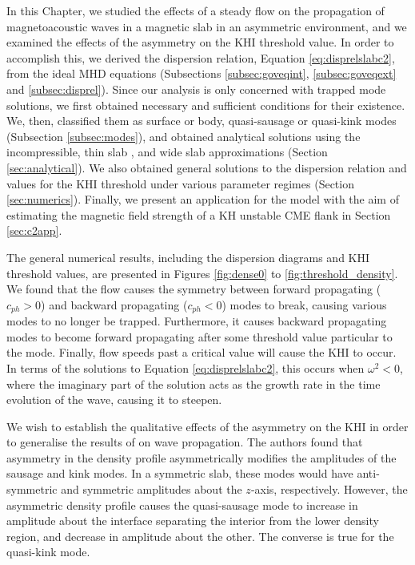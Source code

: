 In this Chapter, we studied the effects of a steady flow on the propagation of magnetoacoustic waves in a magnetic slab in an asymmetric environment, and we examined the effects of the asymmetry on the KHI threshold value.
In order to accomplish this, we derived the dispersion relation, Equation \eqref{eq:disprelslabc2}, from the ideal MHD equations (Subsections \ref{subsec:goveqint}, \ref{subsec:goveqext} and \ref{subsec:disprel}).
Since our analysis is only concerned with trapped mode solutions, we first obtained necessary and sufficient conditions for their existence.
We, then, classified them as surface or body, quasi-sausage or quasi-kink modes (Subsection \ref{subsec:modes}), and obtained analytical solutions using the incompressible, thin slab , and wide slab approximations (Section \ref{sec:analytical}).
We also obtained general solutions to the dispersion relation and values for the KHI threshold under various parameter regimes (Section \ref{sec:numerics}).
Finally, we present an application for the model with the aim of estimating the magnetic field strength of a KH unstable CME flank in Section \ref{sec:c2app}.

The general numerical results, including the dispersion diagrams and KHI threshold values, are presented in Figures \ref{fig:dense0} to \ref{fig:threshold_density}.
We found that the flow causes the symmetry between forward propagating ($c_{ph} > 0$) and backward propagating ($c_{ph} <0$) modes to break, causing various modes to no longer be trapped.
Furthermore, it causes backward propagating modes to become forward propagating after some threshold value particular to the mode.
Finally, flow speeds past a critical value will cause the KHI to occur.
In terms of the solutions to Equation \eqref{eq:disprelslabc2}, this occurs when $\omega^2 < 0$, where the imaginary part of the solution acts as the growth rate in the time evolution of the wave, causing it to steepen.

We wish to establish the qualitative effects of the asymmetry on the KHI in order to generalise the results of \cite{Allcock2017} on wave propagation.
The authors found that asymmetry in the density profile asymmetrically modifies the amplitudes of the sausage and kink modes.
In a symmetric slab, these modes would have anti-symmetric and symmetric amplitudes about the $z$-axis, respectively.
However, the asymmetric density profile causes the quasi-sausage mode to increase in amplitude about the interface separating the interior from the lower density region, and decrease in amplitude about the other.
The converse is true for the quasi-kink mode.

